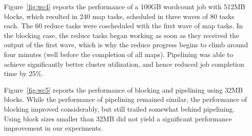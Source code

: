 Figure~\ref{fig:wc4} reports the performance of a 100GB wordcount job with 512MB
blocks, which resulted in 240 map tasks, scheduled in three waves of 80 tasks
each. The 60 reduce tasks were coscheduled with the first wave of map tasks. In
the blocking case, the reduce tasks began working as soon as they received the
output of the first wave, which is why the reduce progress begins to climb
around four minutes (well before the completion of all maps). Pipelining was
able to achieve significantly better cluster utilization, and hence reduced job
completion time by \texttildelow{}25\%.


Figure~\ref{fig:wc5} reports the performance of blocking and pipelining using
32MB blocks. While the performance of pipelining remained similar, the
performance of blocking improved considerably, but still trailed somewhat behind
pipelining. Using block sizes smaller than 32MB did not yield a significant
performance improvement in our experiments.




